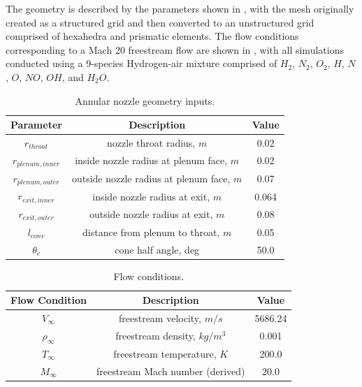 The geometry is described by the parameters shown in ,
with the mesh originally created as a structured grid and then converted to an
unstructured grid comprised of hexahedra and prismatic elements.  The flow
conditions corresponding to a Mach 20 freestream flow are shown in
, with all simulations conducted using a 9-species
Hydrogen-air mixture comprised of $H_2$, $N_2$, $O_2$, $H$, $N$, $O$, $NO$,
$OH$, and $H_2 O$.
\begin{table}[h]
  \centering
  \caption{Annular nozzle geometry inputs.}
  \begin{tabular}{c|c|c}
    Parameter & Description & Value \\
    \hline
    $r_{throat}$       &   nozzle throat radius, $m$                 & 0.02 \\
    $r_{plenum,inner}$ &   inside nozzle radius at plenum face, $m$  & 0.02 \\
    $r_{plenum,outer}$ &   outside nozzle radius at plenum face, $m$ & 0.07 \\
    $r_{exit,inner}$   &   inside nozzle radius at exit, $m$         & 0.064 \\
    $r_{exit,outer}$   &   outside nozzle radius at exit, $m$        & 0.08 \\
    $l_{conv}$         &   distance from plenum to throat, $m$       & 0.05 \\
    $\theta_c$         &   cone half angle, deg                      & 50.0
  \end{tabular}
  \label{tab:annular-geom}
\end{table}
\vspace{0.2cm}
\begin{table}[!h]
  \centering
  \caption{Flow conditions.}
  \begin{tabular}{c|c|c}
    Flow Condition & Description & Value \\
    \hline
    $V_{\infty}$    & freestream velocity, $m/s$        & 5686.24 \\
    $\rho_{\infty}$ & freestream density, $kg/m^3$      & 0.001 \\
    $T_{\infty}$    & freestream temperature, $K$       & 200.0 \\
    $M_{\infty}$    & freestream Mach number (derived)  & 20.0
  \end{tabular}
  \label{tab:flow-conditions}
\end{table}

